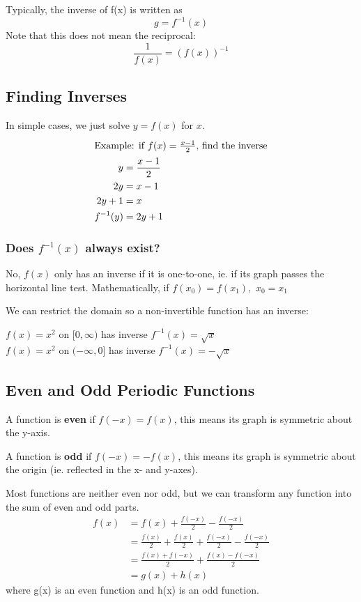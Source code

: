 \documentclass[12pt]{article}
\begin{document}
Typically, the inverse of f(x) is written as \[ g = f^{-1}(x) \] Note that this does not mean the reciprocal: \[ \frac{1}{f(x)} = (f(x))^{-1} \]

\subsection*{Finding Inverses}
In simple cases, we just solve $y = f(x)$ for $x$.
\begin{align*}
\intertext{Example: if $f(x) = \frac{x-1}{2}$, find the inverse}
y &= \frac{x-1}{2}\\
2y &= x-1\\
2y + 1 &= x\\
f^{-1}(y) &= 2y + 1
\end{align*}

\subsubsection*{Does $f^{-1}(x)$ always exist?}
No, $f(x)$ only has an inverse if it is one-to-one, ie. if its graph passes the horizontal line test. Mathematically, if $f(x_0) = f(x_1),$ $x_0 = x_1$

We can restrict the domain so a non-invertible function has an inverse:
\begin{center}
$f(x) = x^2$ on $[0,\infty )$ has inverse $f^{-1}(x) = \sqrt{x}$\\
$f(x) = x^2$ on $(-\infty ,0]$ has inverse $f^{-1}(x) = -\sqrt{x}$
\end{center}

\subsection*{Even and Odd Periodic Functions}
A function is {\bf even} if $f(-x) = f(x)$, this means its graph is symmetric about the y-axis.

A function is {\bf odd} if $f(-x) = -f(x)$, this means its graph is symmetric about the origin (ie. reflected in the x- and y-axes).

Most functions are neither even nor odd, but we can transform any function into the sum of even and odd parts.
\begin{align*}
f(x) &= f(x) + \frac{f(-x)}{2} - \frac{f(-x)}{2}\\
&= \frac{f(x)}{2} + \frac{f(x)}{2} + \frac{f(-x)}{2} - \frac{f(-x)}{2}\\
&= \frac{f(x) + f(-x)}{2} + \frac{f(x) - f(-x)}{2}\\
&= g(x) + h(x)
\end{align*}
where g(x) is an even function and h(x) is an odd function.
\end{document}
